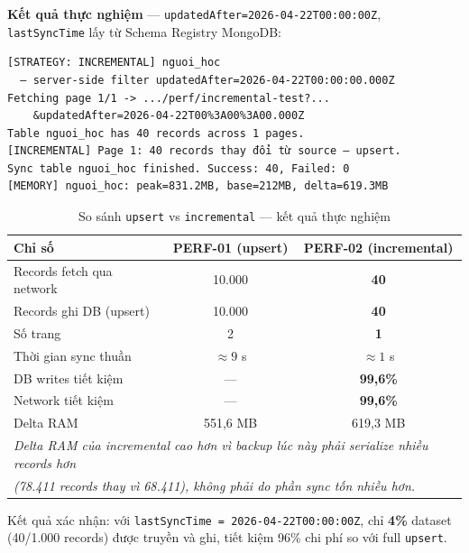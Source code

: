 \textbf{Kết quả thực nghiệm} — \texttt{updatedAfter=2026-04-22T00:00:00Z},
\texttt{lastSyncTime} lấy từ Schema Registry MongoDB:

\begin{verbatim}
[STRATEGY: INCREMENTAL] nguoi_hoc
  — server-side filter updatedAfter=2026-04-22T00:00:00.000Z
Fetching page 1/1 -> .../perf/incremental-test?...
    &updatedAfter=2026-04-22T00%3A00%3A00.000Z
Table nguoi_hoc has 40 records across 1 pages.
[INCREMENTAL] Page 1: 40 records thay đổi từ source — upsert.
Sync table nguoi_hoc finished. Success: 40, Failed: 0
[MEMORY] nguoi_hoc: peak=831.2MB, base=212MB, delta=619.3MB
\end{verbatim}

\begin{table}[H]
\centering
\caption{So sánh \texttt{upsert} vs \texttt{incremental} — kết quả thực nghiệm}
\label{tab:perf-comparison}
\begin{tabular}{lcc}
\toprule
\textbf{Chỉ số} & \textbf{PERF-01 (upsert)} & \textbf{PERF-02 (incremental)} \\
\midrule
Records fetch qua network   & 10.000            & \textbf{40} \\
Records ghi DB (upsert)     & 10.000            & \textbf{40} \\
Số trang                    & 2                 & \textbf{1} \\
Thời gian sync thuần        & $\approx 9$ s     & $\approx 1$ s \\
DB writes tiết kiệm         & —                 & \textbf{99,6\%} \\
Network tiết kiệm           & —                 & \textbf{99,6\%} \\
\midrule
Delta RAM                   & 551,6 MB          & 619,3 MB \\
\multicolumn{3}{l}{\footnotesize\textit{Delta RAM của incremental cao hơn vì backup lúc này
phải serialize nhiều records hơn}} \\
\multicolumn{3}{l}{\footnotesize\textit{(78.411 records thay vì 68.411),
không phải do phần sync tốn nhiều hơn.}} \\
\bottomrule
\end{tabular}
\end{table}

Kết quả xác nhận: với \texttt{lastSyncTime = 2026-04-22T00:00:00Z},
chỉ \textbf{4\%} dataset (40/1.000 records) được truyền và ghi,
tiết kiệm 96\% chi phí so với full \texttt{upsert}.

